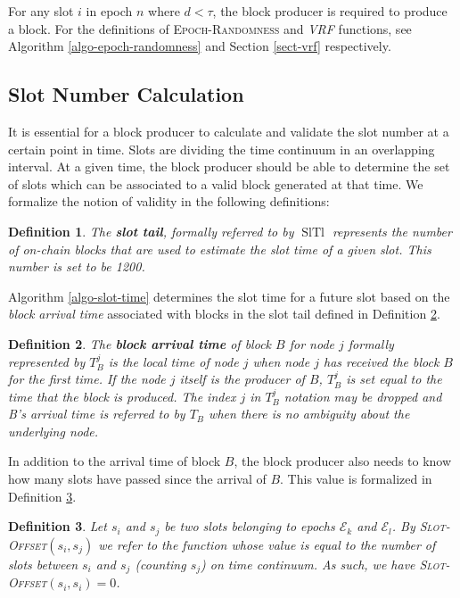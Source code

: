 \documentclass{book}
\newcommand{\tmem}[1]{{\em #1\/}}
\newcommand{\tmname}[1]{\textsc{#1}}
\newcommand{\tmop}[1]{\ensuremath{\operatorname{#1}}}
\newcommand{\tmstrong}[1]{\textbf{#1}}
\newcommand{\tmtextbf}[1]{{\bfseries{#1}}}
\newcommand{\tmtextit}[1]{{\itshape{#1}}}
\newcommand{\tmtextsc}[1]{{\scshape{#1}}}
\newcommand{\tmtexttt}[1]{{\ttfamily{#1}}}
\newcommand{\tmverbatim}[1]{{\ttfamily{#1}}}
\newtheorem{definition}{Definition}
\providecommand{\tmem}[1]{\tmtextit{#1}}
\providecommand{\tmname}[1]{\tmtextsc{#1}}
\providecommand{\tmop}[1]{\ensuremath{\mathrm{#1}}}
\providecommand{\tmstrong}[1]{\tmtextbf{#1}}
\providecommand{\tmtextbf}[1]{\tmtextbf{#1}}
\providecommand{\tmtextit}[1]{\tmtextit{#1}}
\providecommand{\tmverbatim}[1]{\tmtexttt{#1}}
\newtheorem{definition}{Definition}
\begin{document}
For any slot $i$ in epoch $n$ where $d < \tau$, the block producer is required
to produce a block. For the definitions of {\tmname{Epoch-Randomness}} and
{\tmem{{\tmname{VRF}}}} functions, see Algorithm \ref{algo-epoch-randomness}
and Section \ref{sect-vrf} respectively.

\subsection{Slot Number Calculation}

It is essential for a block producer to calculate and validate the slot number
at a certain point in time. Slots are dividing the time continuum in an
overlapping interval. At a given time, the block producer should be able to
determine the set of slots which can be associated to a valid block generated
at that time. We formalize the notion of validity in the following
definitions:

\begin{definition}
  \label{slot-time-cal-tail}The {\tmstrong{slot tail}}, formally referred to
  by $\tmop{SlTl}$ represents the number of on-chain blocks that are used to
  estimate the slot time of a given slot. This number is set to be 1200.
\end{definition}

Algorithm \ref{algo-slot-time} determines the slot time for a future slot
based on the {\tmem{block arrival time}} associated with blocks in the slot
tail defined in Definition \ref{defn-block-time}.

\begin{definition}
  \label{defn-block-time}The {\tmstrong{block arrival time}} of block $B$ for
  node $j$ formally represented by {\tmstrong{$T^j_B$}} is the local time
  of\tmverbatim{} node $j$ when node $j$ has received the block $B$ for the
  first time. If the node $j$ itself is the producer of $B$, $T_B^j$ is set
  equal to the time that the block is produced. The index $j$ in $T^j_B$
  notation may be dropped and B's arrival time is referred to by $T_B$ when
  there is no ambiguity about the underlying node.
\end{definition}

In addition to the arrival time of block $B$, the block producer also needs to
know how many slots have passed since the arrival of $B$. This value is
formalized in Definition \ref{defn-slot-offset}.

\begin{definition}
  \label{defn-slot-offset}Let $s_i$ and $s_j$ be two slots belonging to epochs
  $\mathcal{E}_k$ and $\mathcal{E}_l$. By {\tmname{Slot-Offset}}$(s_i, s_j)$
  we refer to the function whose value is equal to the number of slots between
  $s_i$ and $s_j$ (counting $s_j$) on time continuum. As such, we have
  {\tmname{Slot-Offset}}$(s_i, s_i) = 0$.
\end{definition}
\end{document}
